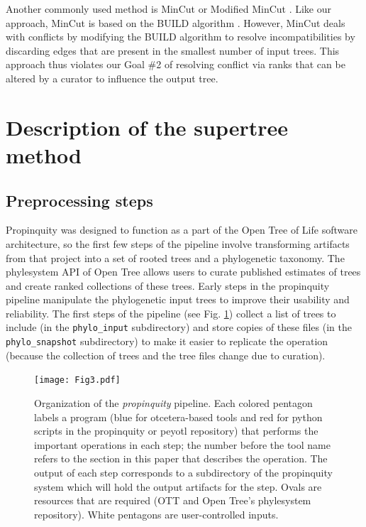 \documentclass[fleqn,12pt,lineno,english]{wlpeerj}
\begin{document}
Another commonly used method is MinCut \citep{semple2000supertree} or
Modified MinCut \citep{page2002modified}.  Like our approach, MinCut
is based on the BUILD algorithm \citep{AhoSSU1981}.  However, MinCut deals
with conflicts by modifying the BUILD algorithm to resolve
incompatibilities by discarding edges that are present in the smallest 
number of input trees.  This approach thus violates our Goal \#2 of
resolving conflict via ranks that can be altered by a curator to
influence the output tree.

\section{Description of the supertree method}

\subsection{Preprocessing steps}

Propinquity was designed to function as a part of the Open Tree of
Life software architecture, so the first few steps of the pipeline
involve transforming artifacts from that project into a set of rooted
trees and a phylogenetic taxonomy. The phylesystem API \citep{McTavishEtAt2015}
of Open Tree allows users to curate published estimates of trees and
create ranked collections of these trees. Early steps in the propinquity
pipeline manipulate the phylogenetic input trees to improve their
usability and reliability. The first steps of the pipeline (see Fig.
\ref{fig:pipeline}) collect a list of trees to include (in the \texttt{phylo\_input}
subdirectory) and store copies of these files (in the \texttt{phylo\_snapshot}
subdirectory) to make it easier to replicate the operation (because
the collection of trees and the tree files change due to curation).
\begin{figure}
\begin{centering}
\texttt{[image: Fig3.pdf]}
\par\end{centering}
\caption{Organization of the \emph{propinquity} pipeline. Each colored pentagon
labels a program (blue for otcetera-based tools and red for python
scripts in the propinquity or peyotl repository) that performs the
important operations in each step; the number before the tool name
refers to the section in this paper that describes the operation.
The output of each step corresponds to a subdirectory of the propinquity
system which will hold the output artifacts for the step. Ovals are
resources that are required (OTT and Open Tree's phylesystem repository).
White pentagons are user-controlled inputs.}
\label{fig:pipeline}
\end{figure}
\end{document}
